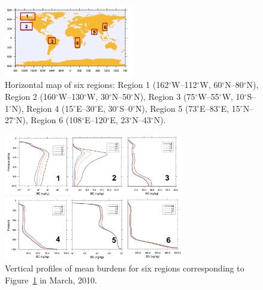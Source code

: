 \documentclass[12pt, fullpage]{uiucthesis2009_2}
\begin{document}
	\begin{figure}[h] 
		\begin{center}
			\includegraphics[width = 0.5\textwidth]{Figure15}
			\caption[Horizontal map of six regions]{\label{fig_P15} Horizontal map of six regions: Region 1 (162$^\circ$W--112$^\circ$W, 60$^\circ$N--80$^\circ$N), Region 2 (160$^\circ$W--130$^\circ$W, 30$^\circ$N--50$^\circ$N), Region 3 (75$^\circ$W--55$^\circ$W, 10$^\circ$S--1$^\circ$N), Region 4 (15$^\circ$E--30$^\circ$E, 30$^\circ$S--0$^\circ$N), Region 5 (73$^\circ$E--83$^\circ$E, 15$^\circ$N--27$^\circ$N), Region 6 (108$^\circ$E--120$^\circ$E, 23$^\circ$N--43$^\circ$N).}
		\end{center}
	\end{figure}
	
	\begin{figure}[h] 
		\begin{center}
			\includegraphics[width = 0.7\textwidth]{Figure14}
			\caption[Vertical profiles of mean  burdens for six regions corresponding to Figure~\ref{fig_P15} in March, 2010]{\label{fig_P14} Vertical profiles of mean  burdens for six regions corresponding to Figure~\ref{fig_P15} in March, 2010.}
		\end{center}
	\end{figure}
	
\end{document}
